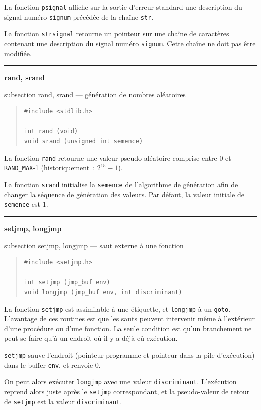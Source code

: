 \documentclass [twoside] {report}
\newcommand {\primitive} [1]
    {
	\phantomsection
	{\large \textbf {#1}}
	\addcontentsline {toc} {subsection} {#1}
    }
\newcommand {\separation}
    {
	\vspace {5mm}
	\nopagebreak
	\hrule
    }
\begin{document}
La fonction \texttt {psignal} affiche sur la sortie d'erreur standard une
description du signal numéro \texttt {signum} précédée de la chaîne
\texttt {str}.

La fonction \texttt {strsignal} retourne un pointeur sur une chaîne de
caractères contenant une description du signal numéro \texttt {signum}.
Cette chaîne ne doit pas être modifiée.



\separation 
\primitive {rand, srand} --- génération de nombres aléatoires

\begin {quote}
\begin {verbatim}
#include <stdlib.h>

int rand (void)
void srand (unsigned int semence)
\end{verbatim}
\end {quote}

La fonction \texttt {rand} retourne une valeur pseudo-aléatoire comprise
entre 0 et \texttt {RAND\_MAX}-1 (historiquement~: $2^{15}-1$).

La fonction \texttt {srand} initialise la \texttt {semence} de l'algorithme de
génération afin de changer la séquence de génération des valeurs.
Par défaut, la valeur initiale de \texttt {semence} est 1.




\separation 
\primitive {setjmp, longjmp} --- saut externe à une fonction

\begin {quote}
\begin {verbatim}
#include <setjmp.h>

int setjmp (jmp_buf env)
void longjmp (jmp_buf env, int discriminant)
\end{verbatim}
\end {quote}

La fonction \texttt {setjmp} est assimilable à une étiquette, et
\texttt {longjmp} à un \texttt {goto}. L'avantage de ces routines est que
les sauts peuvent intervenir même à l'extérieur d'une
procédure ou d'une fonction. La seule condition est qu'un
branchement ne peut se faire qu'à un endroit où il y a déjà
eû exécution.

\texttt {setjmp} sauve l'endroit (pointeur programme et pointeur
dans la pile d'exécution) dans le buffer \texttt {env}, et renvoie
0.

On peut alors exécuter \texttt {longjmp} avec une valeur
\texttt {discriminant}. L'exécution reprend alors juste après le
\texttt {setjmp} correspondant, et la pseudo-valeur de retour de
\texttt {setjmp} est la valeur \texttt {discriminant}.
\end{document}
